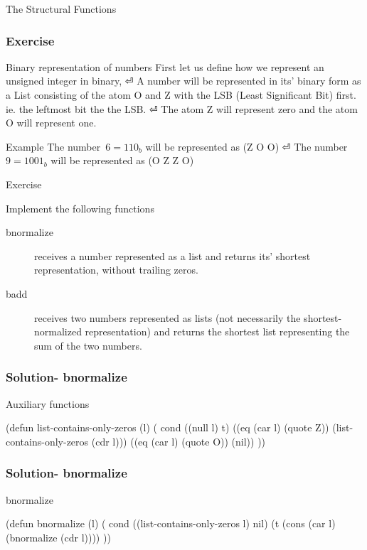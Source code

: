 \documentclass[fleqn]{beamer}
\begin{document}
\begin{frame}{The Structural Functions}
\begin{frame}
\frametitle{Exercise}
\begin{block}{Binary representation of numbers}
  First let us define how we represent an unsigned integer in binary, ⏎
  A number will be represented in its' binary form as a List consisting of the atom O and Z with the LSB (Least Significant Bit) first. ie. the leftmost bit the the LSB. ⏎
  The atom Z will represent zero and the atom O will represent one.
\end{block}

\begin{block}{Example}
  The number~$6={110}_b$ will be represented as (Z O O) ⏎
  The number~$9={1001}_b$ will be represented as (O Z Z O)
\end{block}
\end{frame}

\begin{frame}{Exercise}
\begin{block}{Implement the following functions}
  \begin{description}
    \item [bnormalize] receives a number represented as a list and returns its'
      shortest representation, without trailing zeros.
    \item [badd] receives two numbers represented as lists (not necessarily the
      shortest-
      normalized representation) and returns the shortest list representing the
      sum of the two numbers.
  \end{description}
\end{block}
\end{frame}

\begin{frame}[fragile]
\frametitle{Solution- bnormalize}
\begin{block}{Auxiliary functions}
  \begin{LISP}
(defun list-contains-only-zeros (l) (
  cond
    ((null l) t)
    ((eq (car l) (quote Z))
      (list-contains-only-zeros (cdr l)))
    ((eq (car l) (quote O)) (nil))
))
    \end{LISP}
\end{block}
\end{frame}

\begin{frame}[fragile]
\frametitle{Solution- bnormalize}
\begin{block}{bnormalize}
  \begin{LISP}
(defun bnormalize (l) (
  cond
    ((list-contains-only-zeros l) nil)
    (t (cons (car l) (bnormalize (cdr l))))
))
    \end{LISP}
\end{block}
\end{frame}


\end{frame}
\end{document}
